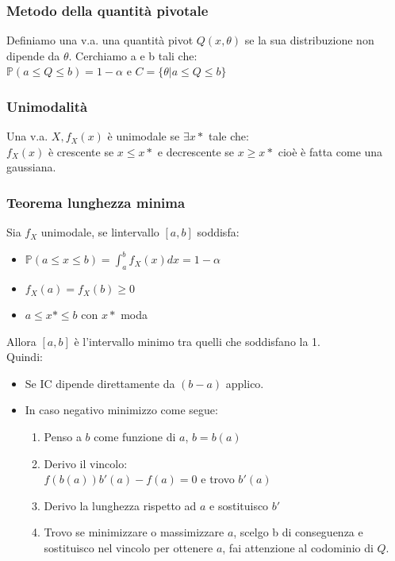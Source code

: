 \documentclass[a4paper,notitlepage]{report}%
\newcommand{\p}{\mathbb{P}} %
\begin{document}
\begin{multicols*}{2}
        \subsubsection*{Metodo della quantità pivotale}
        Definiamo una v.a. una quantità pivot $Q(x,\theta)$
        se la sua distribuzione non dipende da $\theta$.
        Cerchiamo a e b tali che: \\
        $\p(a\leq Q \leq b) = 1-\alpha$ e $C = \{\theta | a\leq Q \leq b\} $


        \subsubsection*{Unimodalità}
        Una v.a. $X,f_X(x)$ è unimodale
        se $\exists x*$ tale che:\\
        $f_X(x)$ è crescente se $x\leq x*$ e decrescente se $x\geq x*$
        cioè è fatta come una gaussiana. 

        
        \subsubsection*{Teorema lunghezza minima}
        Sia $f_X$ unimodale, se lintervallo $[a,b]$ soddisfa:
        \begin{itemize}
            \item $\p(a\leq x\leq b) = \int_a^b f_X(x) dx = 1-\alpha$
            \item $f_X(a)=f_X(b)\geq0$
            \item $a\leq x* \leq b$ con $x*$ moda
        \end{itemize}
        Allora $[a,b]$ è l'intervallo minimo
        tra quelli che soddisfano la 1. \\
        Quindi:
        \begin{itemize}
            \item Se IC dipende direttamente da $(b-a)$ applico.
            \item In caso negativo minimizzo come segue: \begin{enumerate}
                \item Penso a $b$ come funzione di $a$, $b=b(a)$
                \item Derivo il vincolo:\\
                    $f(b(a))b'(a)-f(a)=0$ e trovo $b'(a)$
                \item Derivo la lunghezza rispetto ad $a$ e sostituisco $b'$
                \item Trovo se minimizzare o massimizzare $a$, scelgo b di conseguenza
                    e sostituisco nel vincolo per ottenere $a$,
                    fai attenzione al codominio di $Q$.
            \end{enumerate}
        \end{itemize}



\end{multicols*}
\end{document}
